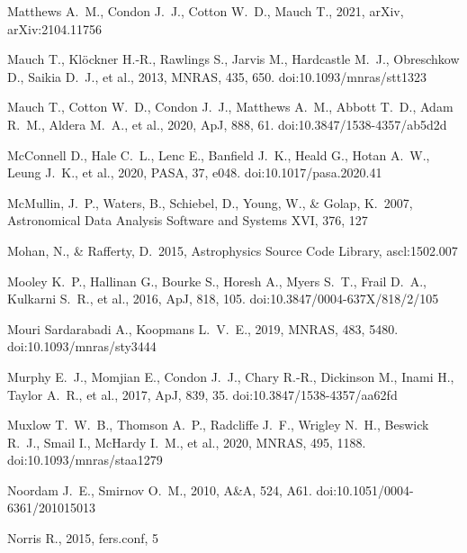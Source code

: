 \documentclass[usenatbib,usedcolumn]{mnras}
\begin{document}
\begin{thebibliography}{}
 Matthews A.~M., Condon J.~J., Cotton W.~D., Mauch T., 2021, arXiv, arXiv:2104.11756

 Mauch T., Kl{\"o}ckner H.-R., Rawlings S., Jarvis M., Hardcastle M.~J., Obreschkow D., Saikia D.~J., et al., 2013, MNRAS, 435, 650. doi:10.1093/mnras/stt1323

 Mauch T., Cotton W.~D., Condon J.~J., Matthews A.~M., Abbott T.~D., Adam R.~M., Aldera M.~A., et al., 2020, ApJ, 888, 61. doi:10.3847/1538-4357/ab5d2d

 McConnell D., Hale C.~L., Lenc E., Banfield J.~K., Heald G., Hotan A.~W., Leung J.~K., et al., 2020, PASA, 37, e048. doi:10.1017/pasa.2020.41

 McMullin, J.~P., Waters, B., Schiebel, D., Young, W., \& Golap, K.\ 2007, Astronomical Data Analysis Software and Systems XVI, 376, 127 

 Mohan, N., \& Rafferty, D.\ 2015, Astrophysics Source Code Library, ascl:1502.007 

 Mooley K.~P., Hallinan G., Bourke S., Horesh A., Myers S.~T., Frail D.~A., Kulkarni S.~R., et al., 2016, ApJ, 818, 105. doi:10.3847/0004-637X/818/2/105

 Mouri Sardarabadi A., Koopmans L.~V.~E., 2019, MNRAS, 483, 5480. doi:10.1093/mnras/sty3444

 Murphy E.~J., Momjian E., Condon J.~J., Chary R.-R., Dickinson M., Inami H., Taylor A.~R., et al., 2017, ApJ, 839, 35. doi:10.3847/1538-4357/aa62fd

 Muxlow T.~W.~B., Thomson A.~P., Radcliffe J.~F., Wrigley N.~H., Beswick R.~J., Smail I., McHardy I.~M., et al., 2020, MNRAS, 495, 1188. doi:10.1093/mnras/staa1279

 Noordam J.~E., Smirnov O.~M., 2010, A\&A, 524, A61. doi:10.1051/0004-6361/201015013

 Norris R., 2015, fers.conf, 5


\end{thebibliography}
\end{document}
